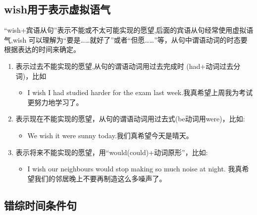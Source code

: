 \subsection{wish用于表示虚拟语气}

“wish+宾语从句”表示不能或不太可能实现的愿望,后面的宾语从句经常使用虚拟语气,wish 可以理解为“要是……就好了”或者“但愿……”等，从句中谓语动词的时态要根据表达的时间来确定。
\begin{enumerate}
  \item 表示过去不能实现的愿望,从句的谓语动词用过去完成时 (had+动词过去分词)，比如
        \begin{itemize}
          \item I wish I had studied harder for the exam last week.我真希望上周我为考试更努力地学习了。
        \end{itemize}
  \item 表示现在不能实现的愿望，从句的谓语动词用过去式(be动词用were)，比如:
        \begin{itemize}
          \item We wish it were sunny today.我们真希望今天是晴天。
        \end{itemize}
  \item 表示将来不能实现的愿望，用“would(could)+动词原形”，比如:
        \begin{itemize}
          \item I wish our neighbours would stop making so much noise at night. 我真希望我们的邻居晚上不要再制造这么多噪声了。
        \end{itemize}
\end{enumerate}

\subsection{错综时间条件句}

